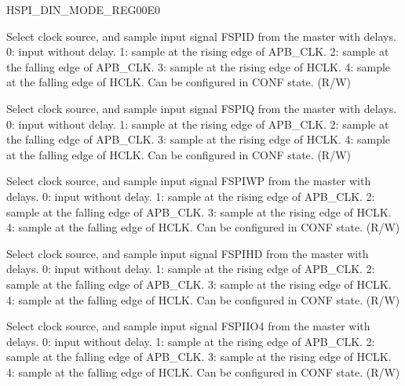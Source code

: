 \begin{register}{H}{SPI\_DIN\_MODE\_REG}{\hexprefix{}00E0}\label{regdesc:SPIDINMODEREG}
%
%
%
%
%
%
%
%
%
%
\regnewline%
\begin{regdesc}\begin{reglist}
\label{fielddesc:SPIDIN0MODE}\item [SPI\_DIN0\_MODE]
Select clock source, and sample input signal FSPID from the master with delays. 0: input without delay. 1: sample at the rising edge of APB\_CLK. 2: sample at the falling edge of APB\_CLK. 3: sample at the rising edge of HCLK. 4: sample at the falling edge of HCLK. Can be configured in CONF state. (R/W)
\label{fielddesc:SPIDIN1MODE}\item [SPI\_DIN1\_MODE] Select clock source, and sample input signal FSPIQ from the master with delays. 0: input without delay. 1: sample at the rising edge of APB\_CLK. 2: sample at the falling edge of APB\_CLK. 3: sample at the rising edge of HCLK. 4: sample at the falling edge of HCLK. Can be configured in CONF state. (R/W)
\label{fielddesc:SPIDIN2MODE}\item [SPI\_DIN2\_MODE] Select clock source, and sample input signal FSPIWP from the master with delays. 0: input without delay. 1: sample at the rising edge of APB\_CLK. 2: sample at the falling edge of APB\_CLK. 3: sample at the rising edge of HCLK. 4: sample at the falling edge of HCLK. Can be configured in CONF state. (R/W)
\label{fielddesc:SPIDIN3MODE}\item [SPI\_DIN3\_MODE] Select clock source, and sample input signal FSPIHD from the master with delays. 0: input without delay. 1: sample at the rising edge of APB\_CLK. 2: sample at the falling edge of APB\_CLK. 3: sample at the rising edge of HCLK. 4: sample at the falling edge of HCLK. Can be configured in CONF state. (R/W)
\label{fielddesc:SPIDIN4MODE}\item [SPI\_DIN4\_MODE] Select clock source, and sample input signal FSPIIO4 from the master with delays. 0: input without delay. 1: sample at the rising edge of APB\_CLK. 2: sample at the falling edge of APB\_CLK. 3: sample at the rising edge of HCLK. 4: sample at the falling edge of HCLK. Can be configured in CONF state. (R/W)

\end{reglist}
\end{regdesc}
\end{register}
